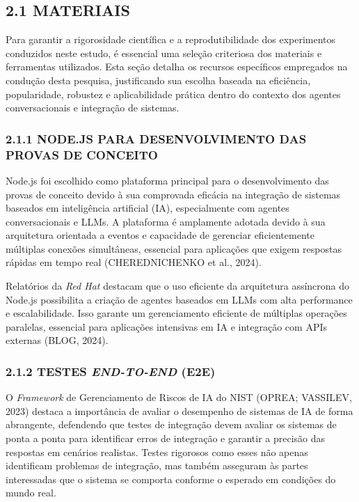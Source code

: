 \documentclass[
]{article}
\begin{document}
\subsection{2.1 MATERIAIS}\label{materiais}

Para garantir a rigorosidade científica e a reprodutibilidade dos
experimentos conduzidos neste estudo, é essencial uma seleção criteriosa
dos materiais e ferramentas utilizados. Esta seção detalha os recursos
específicos empregados na condução desta pesquisa, justificando sua
escolha baseada na eficiência, popularidade, robustez e aplicabilidade
prática dentro do contexto dos agentes conversacionais e integração de
sistemas.

\subsubsection{2.1.1 NODE.JS PARA DESENVOLVIMENTO DAS PROVAS DE
CONCEITO}\label{node.js-para-desenvolvimento-das-provas-de-conceito}

Node.js foi escolhido como plataforma principal para o desenvolvimento
das provas de conceito devido à sua comprovada eficácia na integração de
sistemas baseados em inteligência artificial (IA), especialmente com
agentes conversacionais e LLMs. A plataforma é amplamente adotada devido
à sua arquitetura orientada a eventos e capacidade de gerenciar
eficientemente múltiplas conexões simultâneas, essencial para aplicações
que exigem respostas rápidas em tempo real (CHEREDNICHENKO et al.,
2024).

Relatórios da \emph{Red Hat} destacam que o uso eficiente da arquitetura
assíncrona do Node.js possibilita a criação de agentes baseados em LLMs
com alta performance e escalabilidade. Isso garante um gerenciamento
eficiente de múltiplas operações paralelas, essencial para aplicações
intensivas em IA e integração com APIs externas (BLOG, 2024).

\subsubsection{\texorpdfstring{2.1.2 TESTES \emph{END-TO-END}
(E2E)}{2.1.2 TESTES END-TO-END (E2E)}}\label{testes-end-to-end-e2e}

O \emph{Framework} de Gerenciamento de Riscos de IA do NIST (OPREA;
VASSILEV, 2023) destaca a importância de avaliar o desempenho de
sistemas de IA de forma abrangente, defendendo que testes de integração
devem avaliar os sistemas de ponta a ponta para identificar erros de
integração e garantir a precisão das respostas em cenários realistas.
Testes rigorosos como esses não apenas identificam problemas de
integração, mas também asseguram às partes interessadas que o sistema se
comporta conforme o esperado em condições do mundo real.
\end{document}
